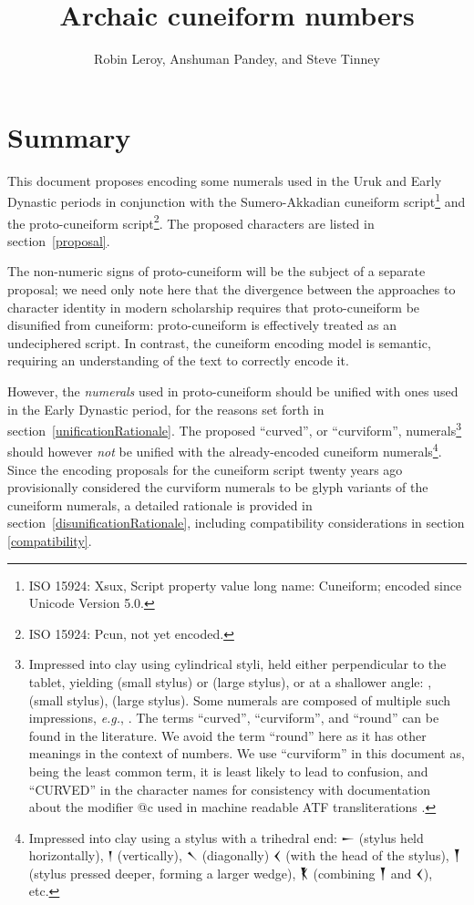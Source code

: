 \documentclass[10pt, a4paper, twoside]{article}
\title{Archaic cuneiform numbers}
\author{Robin Leroy, Anshuman Pandey, and Steve Tinney}
\newcommand\oneAšC{{\proposalfont\symbol{"12550}}} %
\newcommand\oneDišC{{\proposalfont\symbol{"12559}}}
\newcommand\oneUC{{\proposalfont\symbol{"12562}}}
\newcommand\oneŊešTwoC{{\proposalfont\symbol{"1256B}}}
\newcommand\oneŊešʾuC{{\proposalfont\symbol{"12574}}}
\newcommand\oneŠarTwoC{{\proposalfont\symbol{"12579}}}
\newcommand\oneŠarʾuC{{\proposalfont\symbol{"12582}}}
\newcommand{\exempligratia}{\emph{e.g.}}
\begin{document}
\maketitle

\tableofcontents

\section{Summary}

This document proposes encoding some numerals used in the Uruk and Early Dynastic periods in conjunction
with the Sumero-Akkadian cuneiform script\footnote{ISO 15924: Xsux, Script property value long name: Cuneiform; encoded since Unicode Version 5.0.}
and the proto-cuneiform script\footnote{ISO 15924: Pcun, not yet encoded.}.
The proposed characters are listed in section~\ref{proposal}.

The non-numeric signs of proto-cuneiform will be the subject of a separate proposal;
we need only note here that the divergence between the approaches to character identity
in modern scholarship requires that proto-cuneiform be disunified from cuneiform:
proto-cuneiform is effectively treated as an undeciphered script.
In contrast, the cuneiform encoding model is semantic,
requiring an understanding of the text to correctly encode it.

However, the \emph{numerals} used in proto-cuneiform should be unified with
ones used in the Early Dynastic period, for the reasons set forth in
section~\ref{unificationRationale}.
The proposed ``curved'', or ``curviform'', numerals\footnote{%
Impressed into clay using cylindrical styli,
held either perpendicular to the tablet, yielding
\oneUC{} (small stylus) or
\oneŠarTwoC{} (large stylus),
or at a shallower angle:
\oneAšC, \oneDišC{} (small stylus),
\oneŊešTwoC{} (large stylus).
Some numerals are composed of multiple such impressions,
\exempligratia, \oneŊešʾuC.
The terms ``curved'', ``curviform'', and ``round''
can be found in the literature.
We avoid the term ``round'' here as it has other meanings
in the context of numbers.
We use ``curviform'' in this document as, being the least
common term, it is least likely to lead to confusion,
and ``CURVED'' in the character names for consistency
with documentation about the modifier @c used in machine
readable ATF transliterations \cite{inlineATF}.}
should however \emph{not} be unified with
the already-encoded cuneiform numerals\footnote{%
Impressed into clay using a stylus with a trihedral end:
{\xsuxfont 𒀸} (stylus held horizontally),
{\xsuxfont 𒁹} (vertically),
{\xsuxfont 𒀹} (diagonally)
{\xsuxfont 𒌋} (with the head of the stylus),
{\xsuxfont 𒐕} (stylus pressed deeper, forming a larger wedge),
{\xsuxfont 𒐞} (combining {\xsuxfont 𒐕} and {\xsuxfont 𒌋}), etc.}.
Since the encoding proposals for the cuneiform script
twenty years ago provisionally considered the curviform numerals
to be glyph variants of the cuneiform numerals,
a detailed rationale is provided in section~\ref{disunificationRationale},
including compatibility considerations in section \ref{compatibility}.
\end{document}
